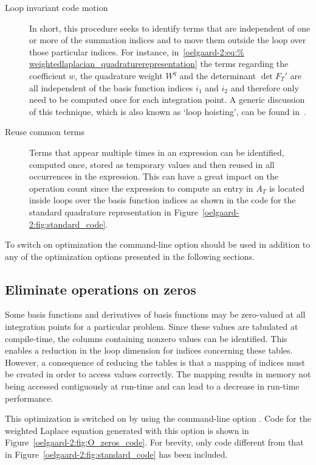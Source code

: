 \begin{description}
\item[Loop invariant code motion] In short, this procedure seeks to
identify terms that are independent of one or more of the summation
indices and to move them outside the loop over those particular
indices.  For instance, in~\eqref{oelgaard-2:eq:%
weightedlaplacian_quadraturerepresentation} the terms regarding the
coefficient $w$, the quadrature weight $W^q$ and the determinant $\det
F_T'$ are all independent of the basis function indices $i_1$ and
$i_2$ and therefore only need to be computed once for each integration
point.  A generic discussion of this technique, which is also known as
`loop hoisting', can be found in~\citet{AhoSethiUllman1986}.

\item[Reuse common terms] Terms that appear multiple times in an
  expression can be identified, computed once, stored as temporary
  values and then reused in all occurrences in the expression.  This can
  have a great impact on the operation count since the expression to
  compute an entry in $A_T$ is located inside loops over the basis
  function indices as shown in the code for the standard quadrature
  representation in Figure~\ref{oelgaard-2:fig:standard_code}.
\end{description}

To switch on optimization the command-line option  should be
used in addition to any of the \ffc{} optimization options presented
in the following sections.

\subsection{Eliminate operations on zeros}
\label{oelgaard-2:sec:eliminate_zeros}

Some basis functions and derivatives of basis functions may be
zero-valued at all integration points for a particular problem.  Since
these values are tabulated at compile-time, the columns containing
nonzero values can be identified.  This enables a reduction in the
loop dimension for indices concerning these tables.  However, a
consequence of reducing the tables is that a mapping of indices must
be created in order to access values correctly.  The mapping results
in memory not being accessed contiguously at run-time and can lead to a
decrease in run-time performance.

This optimization is switched on by using the command-line option
. Code for the weighted Laplace equation
generated with this option is shown in
Figure~\ref{oelgaard-2:fig:O_zeros_code}. For brevity, only code
different from that in Figure~\ref{oelgaard-2:fig:standard_code} has
been included.

